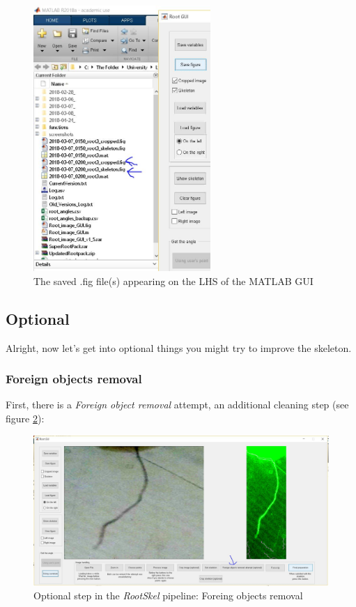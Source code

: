 \begin{figure}[H]
	\centering
	\includegraphics[width=0.6\textwidth]{../Figures/manual/save6.jpg}
	\caption{The saved .fig file(s) appearing on the LHS of the MATLAB GUI}
	\label{fig:img29}
\end{figure}


\subsection{Optional}

Alright, now let's get into optional things you might try to improve the skeleton.

\subsubsection{Foreign objects removal}

First, there is a \textit{Foreign object removal} attempt, an additional cleaning step (see figure \ref{fig:img30}):

\begin{figure}[H]
	\centering
	\includegraphics[width=\textwidth]{../Figures/manual/optionalA1.jpg}
	\caption{Optional step in the \textit{RootSkel} pipeline: Foreing objects removal}
	\label{fig:img30}
\end{figure}

